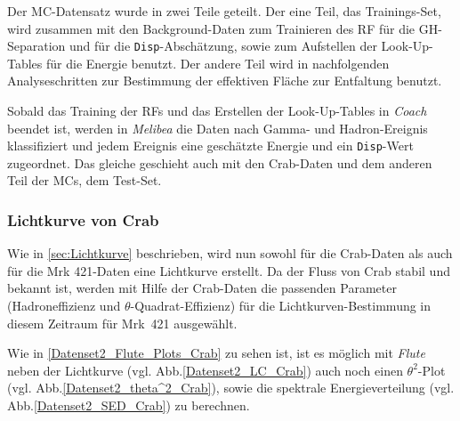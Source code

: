 Der MC-Datensatz wurde in zwei Teile geteilt.
Der eine Teil, das Trainings-Set, wird zusammen mit den Background-Daten zum Trainieren des RF für die GH-Separation und für die \texttt{Disp}-Abschätzung, sowie zum Aufstellen der Look-Up-Tables für die Energie benutzt.
Der andere Teil wird in nachfolgenden Analyseschritten zur Bestimmung der effektiven Fläche zur Entfaltung benutzt.

Sobald das Training der RFs und das Erstellen der Look-Up-Tables in \textit{Coach} beendet ist, werden in \textit{Melibea} die Daten nach Gamma- und Hadron-Ereignis klassifiziert und jedem Ereignis eine geschätzte Energie und ein \texttt{Disp}-Wert zugeordnet.
Das gleiche geschieht auch mit den Crab-Daten und dem anderen Teil der MCs, dem Test-Set.


\subsubsection{Lichtkurve von Crab}
Wie in \autoref{sec:Lichtkurve} beschrieben, wird nun sowohl für die Crab-Daten als auch für die Mrk 421-Daten eine Lichtkurve erstellt.
Da der Fluss von Crab stabil und bekannt ist, werden mit Hilfe der Crab-Daten die passenden Parameter (Hadroneffizienz und $\theta$-Quadrat-Effizienz) für die Lichtkurven-Bestimmung in diesem Zeitraum für Mrk~421 ausgewählt.

Wie in \autoref{Datenset2_Flute_Plots_Crab} zu sehen ist, ist es möglich mit \textit{Flute} neben der Lichtkurve (vgl. Abb.\ref{Datenset2_LC_Crab}) auch noch einen $\theta^2$-Plot (vgl. Abb.\ref{Datenset2_theta^2_Crab}), sowie die spektrale Energieverteilung (vgl. Abb.\ref{Datenset2_SED_Crab}) zu berechnen.

